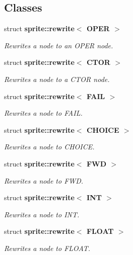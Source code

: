 \subsection*{Classes}
\begin{CompactItemize}
\item 
struct {\bf sprite::rewrite$<$ OPER $>$}
\begin{CompactList}\small\item\em Rewrites a node to an OPER node. \item\end{CompactList}\item 
struct {\bf sprite::rewrite$<$ CTOR $>$}
\begin{CompactList}\small\item\em Rewrites a node to a CTOR node. \item\end{CompactList}\item 
struct {\bf sprite::rewrite$<$ FAIL $>$}
\begin{CompactList}\small\item\em Rewrites a node to FAIL. \item\end{CompactList}\item 
struct {\bf sprite::rewrite$<$ CHOICE $>$}
\begin{CompactList}\small\item\em Rewrites a node to CHOICE. \item\end{CompactList}\item 
struct {\bf sprite::rewrite$<$ FWD $>$}
\begin{CompactList}\small\item\em Rewrites a node to FWD. \item\end{CompactList}\item 
struct {\bf sprite::rewrite$<$ INT $>$}
\begin{CompactList}\small\item\em Rewrites a node to INT. \item\end{CompactList}\item 
struct {\bf sprite::rewrite$<$ FLOAT $>$}
\begin{CompactList}\small\item\em Rewrites a node to FLOAT. \item\end{CompactList}\end{CompactItemize}
